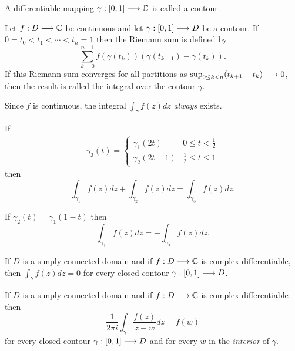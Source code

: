 \documentclass{unswmaths}
\begin{document}
\begin{definition}
    A differentiable mapping $ \gamma : [0,1] \longrightarrow \mathbb{C} $ is called a contour. 
\end{definition}

\begin{definition}
    Let $ f : D \longrightarrow \mathbb{C} $ be continuous and let $ \gamma : [0,1] \longrightarrow D $ be a contour. If $ 0 = t_0 < t_1 < \cdots < t_n = 1 $ then the Riemann sum is defined by
    $$
        \sum_{k=0}^{n-1} f(\gamma(t_k))(\gamma(t_{k-1}) - \gamma(t_k)).
    $$
    If this Riemann sum converges for all partitions as $ \sup_{0 \leq k < n} (t_{k+1} - t_k) \longrightarrow 0 $, then the result is called the integral over the contour $ \gamma $.
\end{definition}

\begin{theorem}
    Since $ f $ is continuous, the integral $ \int_\gamma f(z) dz $ \emph{always} exists.
\end{theorem}

\begin{lemma}
    If 
    \begin{align*}
        \gamma_3(t) =
        \begin{cases}
            \gamma_1(2t) & 0 \leq t < \frac{1}{2} \\
            \gamma_2(2t - 1) & \frac{1}{2} \leq t \leq 1
        \end{cases}
    \end{align*}
    then
    $$
        \int_{\gamma_1} f(z)  dz + \int_{\gamma_2} f(z) dz = \int_{\gamma_3} f(z) dz.
    $$
\end{lemma}

\begin{lemma}
    If $ \gamma_2(t) = \gamma_1(1-t) $ then 
    $$
        \int_{\gamma_1} f(z) dz = -\int_{\gamma_2} f(z) dz.
    $$
\end{lemma}

\begin{theorem}
    If $ D $ is a simply connected domain and if $ f : D \longrightarrow \mathbb{C} $ is complex differentiable, then $ \int_\gamma f(z) dz = 0 $ for every closed contour $ \gamma : [0,1] \longrightarrow D $. 
\end{theorem}

\begin{theorem}
    If $ D $ is a simply connected domain and if $ f : D \longrightarrow \mathbb{C} $ is complex differentiable then
    $$
        \frac{1}{2\pi i } \int_{\gamma} \frac{f(z)}{z - w} dz = f(w)
    $$
for every closed contour $ \gamma : [0,1] \longrightarrow D $ and for every $ w $ in the \emph{interior} of $ \gamma $.
\end{theorem}
\end{document}
